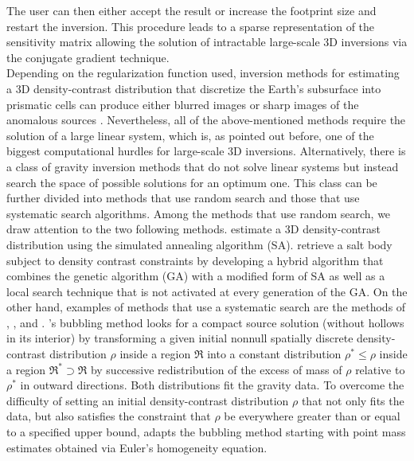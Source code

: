 The user can then either accept the result or increase the footprint size and
restart the inversion.
This procedure leads to a sparse representation of the sensitivity matrix
allowing the solution of intractable large-scale 3D inversions via the
conjugate gradient technique.
\\ \indent 
Depending on the regularization function used, inversion methods for estimating
a 3D density-contrast distribution
that discretize the Earth's subsurface into prismatic cells can produce either
blurred images \citep[e.g.,][]{li_oldenburg98} or sharp images of the anomalous
sources \citep[e.g.,][]{portniaguine99, zhdanov04, silvadias09, silvadias11}.
Nevertheless, all of the above-mentioned methods require the solution of a
large linear system, which is, as pointed out before, one of the biggest
computational hurdles for large-scale 3D inversions.
Alternatively, there is a class of gravity inversion methods that do not solve
linear systems but instead search the space of possible solutions for an
optimum one.
This class can be further divided into methods that use random search and
those that use systematic search algorithms.
Among the methods that use random search, we draw attention to the two following
methods.
\citet{nagihara} estimate a 3D density-contrast distribution using the
simulated annealing algorithm (SA).
\citet{krahenbuhl} retrieve a salt body subject to density contrast
constraints by developing a hybrid algorithm that combines the genetic
algorithm (GA) with a modified form of SA as well as a local search technique
that is not activated at every generation of the GA.
On the other hand, examples of methods that use a
systematic search are the methods of
\citet{zidarov}, \citet{camacho}, and
\citet{rene}.
\citeauthor{zidarov}'s \citeyearpar{zidarov} bubbling method looks
for a compact source solution (without hollows in its interior) by transforming
a given initial nonnull spatially discrete density-contrast distribution
$\rho$ inside a region $\Re$ into a constant distribution $\rho^\ast \le \rho$
inside a region $\Re^\ast \supset \Re$ by successive redistribution of the
excess of mass of $\rho$ relative to $\rho^\ast$ in outward directions.
Both distributions fit the gravity data. To overcome the difficulty of setting
an initial density-contrast distribution $\rho$ that not only fits the data,
but also satisfies the constraint that $\rho$ be everywhere greater than or
equal to a specified upper bound, \citet{cordell} adapts the bubbling
method starting with point mass estimates obtained via Euler's homogeneity
equation.
